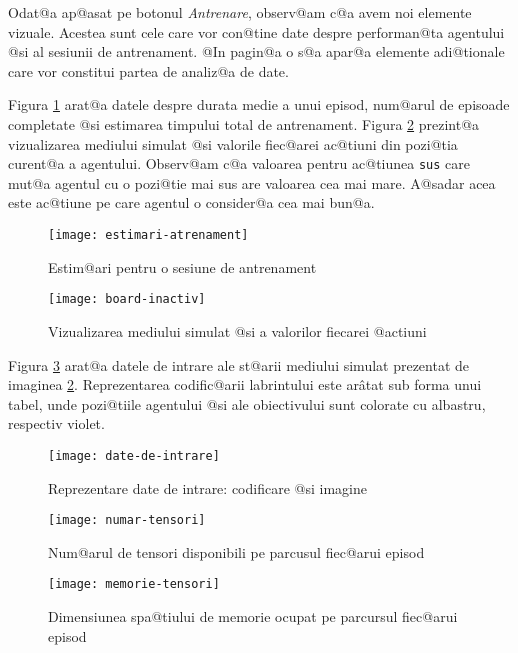 Odat@a ap@asat pe botonul \textsl{Antrenare}, observ@am c@a avem noi elemente vizuale. Acestea sunt cele care vor con@tine date despre performan@ta agentului @si al sesiunii de antrenament. @In pagin@a o s@a apar@a elemente adi@tionale care vor constitui partea de  analiz@a de date. 

Figura \ref{fig:estimari-antrenament} arat@a datele despre durata medie a unui episod, num@arul de episoade completate @si estimarea timpului total de antrenament. Figura \ref{fig:board-inactiv} prezint@a vizualizarea mediului simulat @si valorile fiec@arei ac@tiuni din pozi@tia curent@a a agentului. Observ@am c@a valoarea pentru ac@tiunea \texttt{sus} care mut@a agentul cu o pozi@tie mai sus are valoarea cea mai mare. A@sadar acea este ac@tiune pe care agentul o consider@a cea mai bun@a. 

\begin{figure}[h]
	\centering
	\texttt{[image: estimari-atrenament]}
	\caption{Estim@ari pentru o sesiune de antrenament}
	\label{fig:estimari-antrenament}
\end{figure}

\begin{figure}[h]
	\centering
	\texttt{[image: board-inactiv]}
	\caption{Vizualizarea mediului simulat @si a valorilor fiecarei @actiuni}
	\label{fig:board-inactiv}
\end{figure}

Figura \ref{fig:date-de-intrare} arat@a datele de intrare ale st@arii mediului simulat prezentat de imaginea \ref{fig:board-inactiv}. Reprezentarea codific@arii labrintului este ar\^ atat sub forma unui tabel, unde pozi@tiile agentului @si ale obiectivului sunt colorate cu albastru, respectiv violet.

\begin{figure}[h]
	\centering
	\texttt{[image: date-de-intrare]}
	\caption{Reprezentare date de intrare: codificare @si imagine}
	\label{fig:date-de-intrare}
\end{figure}

\begin{figure}[h]
	\centering
	\texttt{[image: numar-tensori]}
	\caption{Num@arul de tensori disponibili pe parcusul fiec@arui episod}
	\label{fig:numar-tensori}
\end{figure}


\begin{figure}[h]
	\centering
	\texttt{[image: memorie-tensori]}
	\caption{Dimensiunea spa@tiului de memorie ocupat pe parcursul fiec@arui episod}
	\label{fig:memorie-tensori}
\end{figure}








